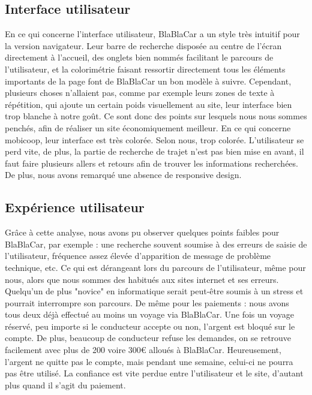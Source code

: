\subsection{Interface utilisateur}

En ce qui concerne l'interface utilisateur, BlaBlaCar a un style très intuitif pour la version navigateur. Leur barre de recherche disposée au centre de l'écran directement à l'accueil, des onglets bien nommés facilitant le parcours de l'utilisateur, et la colorimétrie faisant ressortir directement tous les éléments importants de la page font de BlaBlaCar un bon modèle à suivre. Cependant, plusieurs choses n'allaient pas, comme par exemple leurs zones de texte à répétition, qui ajoute un certain poids visuellement au site, leur interface bien trop blanche à notre goût. Ce sont donc des points sur lesquels nous nous sommes penchés, afin de réaliser un site économiquement meilleur.
En ce qui concerne mobicoop, leur interface est très colorée. Selon nous, trop colorée. L'utilisateur se perd vite, de plus, la partie de recherche de trajet n'est pas bien mise en avant, il faut faire plusieurs allers et retours afin de trouver les informations recherchées. De plus, nous avons remarqué une absence de responsive design. 

\subsection{Expérience utilisateur}

 Grâce à cette analyse, nous avons pu observer quelques points faibles pour BlaBlaCar, par exemple : une recherche souvent soumise à des erreurs de saisie de l'utilisateur, fréquence assez élevée d'apparition de message de problème technique, etc. Ce qui est dérangeant lors du parcours de l'utilisateur, même pour nous, alors que nous sommes des habitués aux sites internet et ses erreurs. Quelqu'un de plus "novice" en informatique serait peut-être soumis à un stress et pourrait interrompre son parcours. De même pour les paiements : nous avons tous deux déjà effectué au moins un voyage via BlaBlaCar. Une fois un voyage réservé, peu importe si le conducteur accepte ou non, l'argent est bloqué sur le compte. De plus, beaucoup de conducteur refuse les demandes, on se retrouve facilement avec plus de 200 voire 300€ alloués à BlaBlaCar. Heureusement, l'argent ne quitte pas le compte, mais pendant une semaine, celui-ci ne pourra pas être utilisé. La confiance est vite perdue entre l'utilisateur et le site, d'autant plus quand il s'agit du paiement.